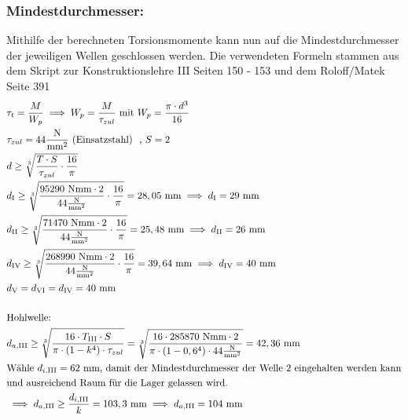 \subsubsection{Mindestdurchmesser:}
Mithilfe der berechneten Torsionsmomente kann nun auf die Mindestdurchmesser der jeweiligen Wellen geschlossen werden. Die verwendeten Formeln stammen aus dem Skript zur Konstruktionslehre III Seiten 150 - 153 und dem Roloff/Matek Seite 391
\begin{align*}
	&\tau_t = \frac{M}{W_p} \implies W_p = \frac{M}{\tau_{zul}} \text{ mit } W_p = \frac{\pi\cdot d^3}{16} \\
	&\tau_{zul} = 44 \frac{\text{N}}{\text{mm}^2} \text{ (Einsatzstahl) } \text{ , } S= 2 \\
	&d \ge \sqrt[3]{ \frac{T \cdot S}{\tau_{zul}} \cdot \frac{16}{\pi}}  \\
	&d_\mathrm{I} \ge \sqrt[3]{ \frac{95290\text{ Nmm} \cdot 2}{44\frac{\text{N}}{\text{mm}^2}} \cdot \frac{16}{\pi}} = 28,05\text{ mm} \implies d_\mathrm{I} = 29\text{ mm} \\
	&d_\mathrm{II} \ge \sqrt[3]{ \frac{71470\text{ Nmm} \cdot 2}{44\frac{\text{N}}{\text{mm}^2}} \cdot \frac{16}{\pi}} = 25,48\text{ mm} \implies d_\mathrm{II} = 26\text{ mm} \\
	&d_\mathrm{IV} \ge \sqrt[3]{ \frac{268990\text{ Nmm} \cdot 2}{44\frac{\text{N}}{\text{mm}^2}} \cdot \frac{16}{\pi}} = 39,64\text{ mm} \implies d_\mathrm{IV} = 40\text{ mm} \\
	&d_\mathrm{V} = d_\mathrm{VI} = d_\mathrm{IV} = 40\text{ mm} \\ \\
&\text{Hohlwelle: } \\
	&d_{a,\mathrm{III}} \ge \sqrt[3]{ \frac{16 \cdot T_{\mathrm{III}} \cdot S}{\pi \cdot (1-k^4) \cdot \tau_{zul}}} = \sqrt[3]{ \frac{16 \cdot 285870\text{ Nmm} \cdot 2}{\pi \cdot (1-0,6^4) \cdot 44 \frac{\text{N}}{\text{mm}^2} }} = 42,36\text{ mm}  \\
	&\text{Wähle }d_{i,\mathrm{III}} =62  \text{ mm} \text{, damit der Mindestdurchmesser der Welle 2 eingehalten werden kann} \\
	&\text{und ausreichend Raum für die Lager gelassen wird.}\\
	&\implies d_{a,\mathrm{III}} \ge  \frac{d_{i,\mathrm{III}}}{k} = 103,3\text{ mm} \implies d_{a,\mathrm{III}} = 104 \text{ mm}\\
\end{align*}
\newpage
